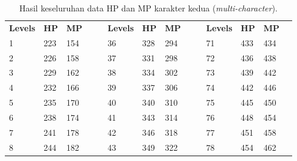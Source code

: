 \begin{table}[!h]
	\centering
	\caption{Hasil keseluruhan data HP dan MP karakter kedua (\textit{multi-character}).}
	\vspace{-1ex}
	\label{tb:player_hp_mp_all_2}
	\begin{tabular}{|l|l|l|ll|l|l|l|llllll}
		\cline{1-3} \cline{6-8} \cline{11-13}
		\cellcolor[HTML]{C0C0C0}\textbf{Levels} & \cellcolor[HTML]{C0C0C0}\textbf{HP} & \cellcolor[HTML]{C0C0C0}\textbf{MP} &  &  & \cellcolor[HTML]{C0C0C0}\textbf{Levels} & \cellcolor[HTML]{C0C0C0}\textbf{HP} & \cellcolor[HTML]{C0C0C0}\textbf{MP} &  & \multicolumn{1}{l|}{} & \multicolumn{1}{l|}{\cellcolor[HTML]{C0C0C0}\textbf{Levels}} & \multicolumn{1}{l|}{\cellcolor[HTML]{C0C0C0}\textbf{HP}} & \multicolumn{1}{l|}{\cellcolor[HTML]{C0C0C0}\textbf{MP}} &  \\ \cline{1-3} \cline{6-8} \cline{11-13}
		1 & 223 & 154 &  &  & 36 & 328 & 294 &  & \multicolumn{1}{l|}{} & \multicolumn{1}{l|}{71} & \multicolumn{1}{l|}{433} & \multicolumn{1}{l|}{434} &  \\ \cline{1-3} \cline{6-8} \cline{11-13}
		2 & 226 & 158 &  &  & 37 & 331 & 298 &  & \multicolumn{1}{l|}{} & \multicolumn{1}{l|}{72} & \multicolumn{1}{l|}{436} & \multicolumn{1}{l|}{438} &  \\ \cline{1-3} \cline{6-8} \cline{11-13}
		3 & 229 & 162 &  &  & 38 & 334 & 302 &  & \multicolumn{1}{l|}{} & \multicolumn{1}{l|}{73} & \multicolumn{1}{l|}{439} & \multicolumn{1}{l|}{442} &  \\ \cline{1-3} \cline{6-8} \cline{11-13}
		4 & 232 & 166 &  &  & 39 & 337 & 306 &  & \multicolumn{1}{l|}{} & \multicolumn{1}{l|}{74} & \multicolumn{1}{l|}{442} & \multicolumn{1}{l|}{446} &  \\ \cline{1-3} \cline{6-8} \cline{11-13}
		5 & 235 & 170 &  &  & 40 & 340 & 310 &  & \multicolumn{1}{l|}{} & \multicolumn{1}{l|}{75} & \multicolumn{1}{l|}{445} & \multicolumn{1}{l|}{450} &  \\ \cline{1-3} \cline{6-8} \cline{11-13}
		6 & 238 & 174 &  &  & 41 & 343 & 314 &  & \multicolumn{1}{l|}{} & \multicolumn{1}{l|}{76} & \multicolumn{1}{l|}{448} & \multicolumn{1}{l|}{454} &  \\ \cline{1-3} \cline{6-8} \cline{11-13}
		7 & 241 & 178 &  &  & 42 & 346 & 318 &  & \multicolumn{1}{l|}{} & \multicolumn{1}{l|}{77} & \multicolumn{1}{l|}{451} & \multicolumn{1}{l|}{458} &  \\ \cline{1-3} \cline{6-8} \cline{11-13}
		8 & 244 & 182 &  &  & 43 & 349 & 322 &  & \multicolumn{1}{l|}{} & \multicolumn{1}{l|}{78} & \multicolumn{1}{l|}{454} & \multicolumn{1}{l|}{462} &  \\ \cline{1-3} \cline{6-8} \cline{11-13}

\end{tabular}
\end{table}

